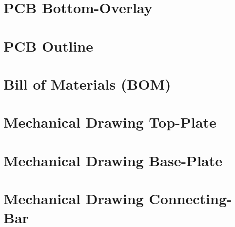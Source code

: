 \section{PCB Bottom-Overlay}
\enlargethispage{2.5cm}
\begin{adjustwidth}{-0.23cm}{0cm} \hfuzz=7.0pt \vfuzz=19.0pt
\end{adjustwidth}
\newpage

\section{PCB Outline}
\enlargethispage{2.5cm}
\begin{adjustwidth}{0.23cm}{0cm} \hfuzz=7.0pt \vfuzz=19.0pt
\end{adjustwidth}
\newpage


\section{Bill of Materials (BOM)}
\enlargethispage{2.5cm}
\begin{adjustwidth}{-0.23cm}{0cm} \hfuzz=7.0pt \vfuzz=20.0pt
\end{adjustwidth}
\newpage


\section{Mechanical Drawing Top-Plate}
\enlargethispage{2.5cm}
\begin{adjustwidth}{0.23cm}{0cm} \hfuzz=7.0pt \vfuzz=20.0pt
\end{adjustwidth}
\newpage

\section{Mechanical Drawing Base-Plate}
\enlargethispage{2.5cm}
\begin{adjustwidth}{-0.23cm}{0cm} \hfuzz=7.0pt \vfuzz=20.0pt
\end{adjustwidth}
\newpage

\section{Mechanical Drawing Connecting-Bar}
\enlargethispage{2.5cm}
\begin{adjustwidth}{0.23cm}{0cm} \hfuzz=7.0pt \vfuzz=20.0pt
\end{adjustwidth}
\newpage






